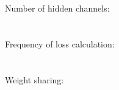 \documentclass{article}
\begin{document}
Number of hidden channels:\\
\\\\

Frequency of loss calculation:\\
\\\\

Weight sharing:\\
\\\\
\end{document}
